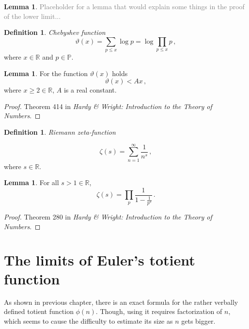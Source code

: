 \documentclass{article}
\theoremstyle{definition}
\newtheorem{definition}[subsubsection]{Definition}
\newtheorem{lemma}[subsubsection]{Lemma}
\begin{document}
\begin{lemma}
\textcolor{gray}{Placeholder for a lemma that would explain some things in the proof of the lower limit...}
\end{lemma}


\begin{definition}{\emph{Chebyshev function}}
\begin{equation*}
    \vartheta(x)=\sum_{p\leq x} \log p = \log \prod_{p\leq x} p\,,
\end{equation*}
where $x\in\mathbb{R}$ and $p\in\mathbb{P}$.

\end{definition}

\begin{lemma}
\label{lemma:vartheta}
For the function $\vartheta(x)$ holds
\begin{equation*}
    \vartheta(x) < Ax\,,
\end{equation*}
where $x\geq2\in\mathbb{R}$, $A$ is a real constant.

\begin{proof}
Theorem 414 in \textit{Hardy \& Wright: Introduction to the Theory of Numbers}.
\end{proof}
\end{lemma}

\begin{definition}{\emph{Riemann zeta-function}}

\begin{equation*}
    \zeta(s)=\sum_{n=1}^\infty \frac{1}{n^s}\,,
\end{equation*}
where $s\in\mathbb{R}$.
\end{definition}

\begin{lemma}
For all $s>1\in\mathbb{R}$, 
\begin{equation*}
    \zeta(s)=\prod_p \frac{1}{1-\frac{1}{p^s}}\,.
\end{equation*}
\begin{proof}
Theorem 280 in \textit{Hardy \& Wright: Introduction to the Theory of Numbers}.
\end{proof}
\end{lemma}

\section{The limits of Euler's totient function}

As shown in previous chapter, there is an exact formula for the rather verbally defined totient function $\phi(n)$. Though, using it requires factorization of $n$, which seems to cause the difficulty to estimate its size as $n$ gets bigger.
\end{document}
